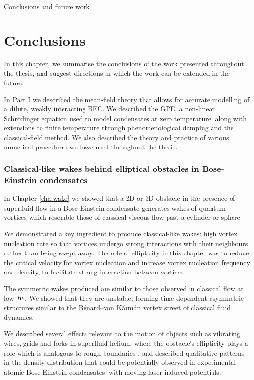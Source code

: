 \begin{chapter}{\label{cha:conc}Conclusions and future work}
\section{Conclusions}
In this chapter, we summarise the conclusions of the work presented throughout the thesis, and suggest directions in which the work can be extended in the future. 

In Part I we described the mean-field theory that allows for accurate modelling of a dilute, weakly interacting BEC. We described the GPE, a non-linear Schr\"odinger equation used to model condensates at zero temperature, along with extensions to finite temperature through phenomenological damping and the classical-field method. We also described the theory and practice of various numerical procedures we have used throughout the thesis.

\subsubsection{Classical-like wakes behind elliptical obstacles in Bose-Einstein condensates}
In Chapter \ref{cha:wake} we showed that a 2D or 3D obstacle in the presence of superfluid flow in a Bose-Einstein condensate generates wakes of quantum vortices which resemble those of classical viscous flow past a cylinder or sphere

We demonstrated a key ingredient to produce classical-like wakes: high vortex nucleation rate so that vortices undergo strong interactions with their neighbours rather than being swept away. The role of ellipticity in this chapter was to reduce the critical velocity for vortex nucleation and increase vortex nucleation frequency and density, to facilitate strong interaction between vortices.  

The symmetric wakes produced are similar to those observed in classical flow at low $\mbox{\ensuremath{\mathit{Re}}}$. We showed that they are unstable, forming time-dependent asymmetric structures similar to the B\'enard--von K\'arm\'an vortex street of classical fluid dynamics.

We described several effects relevant to the motion of objects such as vibrating wires, grids and forks in superfluid helium, where the obstacle's ellipticity plays a role which is analogous to rough boundaries \cite{blaz08,brad05}, and described qualitative patterns in the density distribution that could be potentially observed in experimental atomic Bose-Einstein condensates, with moving laser-induced potentials.


\end{chapter}
